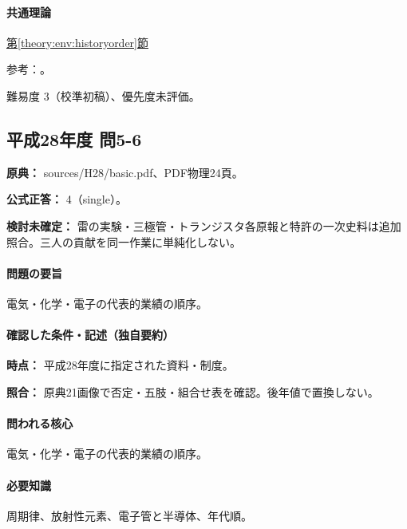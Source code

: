 \paragraph{共通理論} \hyperref[theory:env:historyorder]{第\ref*{theory:env:historyorder}節}

\par 参考：\cite{env58_steam,env58_nylon}。

\par 難易度 3（校準初稿）、優先度未評価。

\subsection{平成28年度 問5-6}
\label{q:h28-reg-basic-5-6}

\noindent\textbf{原典：} sources/H28/basic.pdf、PDF物理24頁。

\textbf{公式正答：} 4（single）。

\par\textbf{検討未確定：} 雷の実験・三極管・トランジスタ各原報と特許の一次史料は追加照合。三人の貢献を同一作業に単純化しない。

\paragraph{問題の要旨} 電気・化学・電子の代表的業績の順序。

\paragraph{確認した条件・記述（独自要約）}\mbox{}\par

\noindent\textbf{時点：} 平成28年度に指定された資料・制度。\par

\noindent\textbf{照合：} 原典21画像で否定・五肢・組合せ表を確認。後年値で置換しない。\par

\paragraph{問われる核心} 電気・化学・電子の代表的業績の順序。

\paragraph{必要知識} 周期律、放射性元素、電子管と半導体、年代順。

